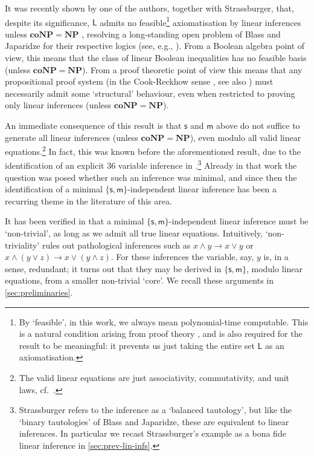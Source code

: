 \documentclass[a4paper, UKenglish, cleveref]{lipics-v2021}
\newcommand{\NP}{\mathbf{NP}}
\newcommand{\co}{\mathbf{co}}
\newcommand{\coNP}{\co\NP}
\newcommand{\infers}{\rightarrow}
\newcommand{\Lin}{\mathsf L}
\newcommand{\m}{\ensuremath{\mathsf{m}}}
\newcommand{\s}{\ensuremath{\mathsf{s}}}
\begin{document}
It was recently shown by one of the authors, together with Strassburger, that, despite its significance, $\Lin$ admits no feasible\footnote{By `feasible', in this work, we always mean polynomial-time computable. This is a natural condition arising from proof theory \cite{CooRec74:length-of-proofs,CooRec79:rel-eff-pps}, and is also required for the result to be meaningful: it prevents us just taking the entire set $\Lin$ as an axiomatisation.} axiomatisation by linear inferences unless $\coNP = \NP$ \cite{DasStr15:no-comp-lin-sys,DasStr16:no-compl-lin-sys}, resolving a long-standing open problem of Blass and Japaridze for their respective logics (see, e.g., \cite{Jap17:elem-base-cirq-calc}).
From a Boolean algebra point of view, this means that the class of linear Boolean inequalities has no feasible basis (unless $\coNP = \NP$).
From a proof theoretic point of view this means that any propositional proof system (in the Cook-Reckhow sense \cite{CooRec74:length-of-proofs,CooRec79:rel-eff-pps}, see also \cite{Kra19:cook-reckhow}) must necessarily admit some `structural' behaviour, even when restricted to proving only linear inferences (unless $\coNP= \NP$).

An immediate consequence of this result is that $\s$ and $\m$ above do not suffice to generate all linear inferences (unless $\coNP= \NP$), even modulo all valid linear equations.\footnote{The valid linear equations are just associativity, commutativity, and unit laws, cf.~\cite{DasStr15:no-comp-lin-sys,DasStr16:no-compl-lin-sys}.}
In fact, this was known before the aforementioned result, due to the identification of an explicit 36 variable inference in \cite{Str12:ext-wo-cut}.\footnote{Strassburger refers to the inference as a `balanced tautology', but like the `binary tautologies' of Blass and Japaridze, these are equivalent to linear inferences. In particular we recast Strassburger's example as a bona fide linear inference in \cref{sec:prev-lin-infs}.}
Already in that work the question was posed whether such an inference was minimal, and since then the identification of a minimal $\{\s,\m \}$-independent linear inference has been a recurring theme in the literature of this area.

It has been verified in \cite{Das13:lin-inf-rew} that a minimal $\{\s,\m \}$-independent linear inference must be `non-trivial', as long as we admit all true linear equations.
Intuitively, `non-triviality' rules out pathological inferences such as $x \land y \infers x \lor y$ or $x \land (y \lor z) \infers x \lor (y \land z)$. For these inferences the variable, say, $y$ is, in a sense, redundant; it turns out that they may be derived in $\{\s,\m\}$, modulo linear equations, from a smaller non-trivial `core'.
We recall these arguments in \cref{sec:preliminaries}.
\end{document}
